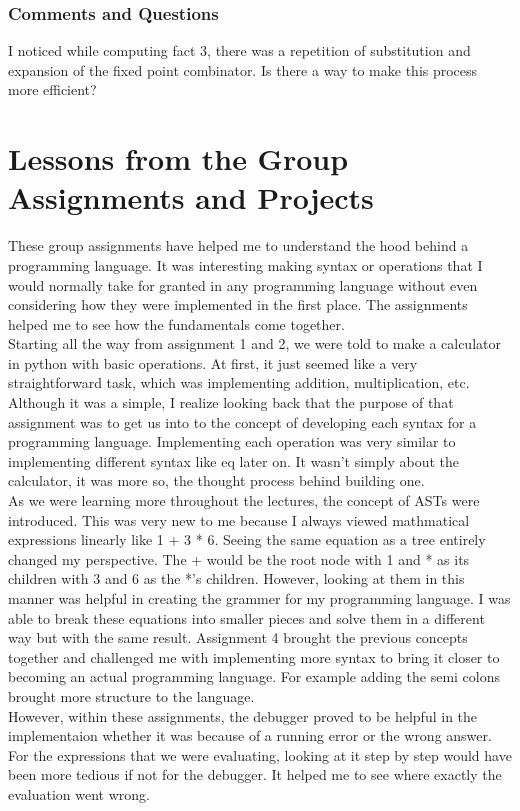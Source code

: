 \documentclass{article}
\theoremstyle{theorem}
\theoremstyle{definition}
\theoremstyle{remark}
\begin{document}
\subsubsection*{Comments and Questions}
I noticed while computing fact 3, there was a repetition of substitution and expansion of the fixed point combinator. Is there a way to make this process more efficient?

\section{Lessons from the Group Assignments and Projects}
These group assignments have helped me to understand the hood behind a programming language. It was 
interesting making syntax or operations that I would normally take for granted in any programming language without even
considering how they were implemented in the first place. The assignments helped me to see how the fundamentals come together. \\
Starting all the way from assignment 1 and 2, we were told to make a calculator in python with basic operations.
At first, it just seemed like a very straightforward task, which was implementing addition, multiplication, etc.
Although it was a simple, I realize looking back that the purpose of that assignment was to get us into to
the concept of developing each syntax for a programming language. Implementing each operation was very similar
to implementing different syntax like eq later on. It wasn't simply about the calculator, it was more so, the thought process
behind building one. \\
As we were learning more throughout the lectures, the concept of ASTs were introduced. This was very
new to me because I always viewed mathmatical expressions linearly like 1 + 3 * 6. Seeing the same equation
as a tree entirely changed my perspective. The + would be the root node with 1 and * as its children with 3 and 6
as the *'s children. However, looking at them in this manner was helpful in creating the grammer for my programming language. 
I was able to break these equations into smaller pieces and solve them in a different way but with the same result. 
Assignment 4 brought the previous concepts together and challenged me with implementing more syntax to bring it 
closer to becoming an actual programming language. For example adding the semi colons brought more structure to the language. \\
However, within these assignments, the debugger proved to be helpful in the implementaion whether it was because
of a running error or the wrong answer. For the expressions that we were evaluating, looking at it step by step would
have been more tedious if not for the debugger. It helped me to see where exactly the evaluation went wrong.
\end{document}
